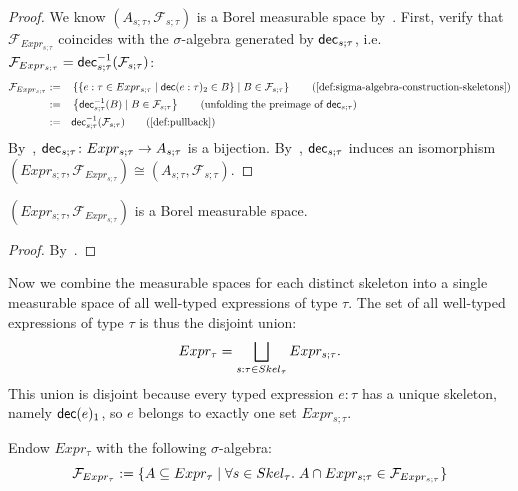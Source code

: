 \begin{proof}
	We know $(A_{s;\tau}, \mathcal{F}_{s;\tau})$ is a Borel measurable space by~. First, verify that $\mathcal{F}_{Expr_{s;\tau}}$ coincides with the $\sigma$-algebra generated by $\mathsf{dec}_{s;\tau}$, i.e. $\mathcal{F}_{Expr_{s;\tau}} = \mathsf{dec}_{s;\tau}^{-1}(\mathcal{F}_{s;\tau})$:
	\begin{align*}
		\mathcal{F}_{Expr_{s;\tau}} := \quad&\left\{
			\{e : \tau \in Expr_{s;\tau} \mid \decompose(e : \tau)_2 \in B\} \mid B \in 
			\mathcal{F}_{s;\tau}
		\right\} \tag{\Cref{def:sigma-algebra-construction-skeletons}} \\
		:= \quad&\left\{
			\decompose_{s;\tau}^{-1}(B) \mid B \in \mathcal{F}_{s;\tau}
		\right\} \tag{unfolding the preimage of $\decompose_{s;\tau}$} \\
		:= \quad&\decompose_{s;\tau}^{-1}(\mathcal{F}_{s;\tau}) \tag{\Cref{def:pullback}}
	\end{align*}
	By~, $\mathsf{dec}_{s;\tau} \colon Expr_{s;\tau} \to A_{s;\tau}$ is a bijection. By~, $\mathsf{dec}_{s;\tau}$ induces an isomorphism $(Expr_{s;\tau}, \mathcal{F}_{Expr_{s;\tau}}) \cong (A_{s;\tau}, \mathcal{F}_{s;\tau})$.
\end{proof}

\begin{lemma}\label{lem:measurable-expr-st}
	$(Expr_{s;\tau}, \mathcal{F}_{Expr_{s;\tau}})$ is a Borel measurable space.
\end{lemma}

\begin{proof}
	By~.
\end{proof}


Now we combine the measurable spaces for each distinct skeleton into a single measurable space of all well-typed expressions of type $\tau$. The set of all well-typed expressions of type $\tau$ is thus the disjoint union:
\[
	Expr_{\tau} = \bigsqcup_{s : \tau \in Skel_{\tau}} Expr_{s;\tau}.
\]
This union is disjoint because every typed expression $e : \tau$ has a unique skeleton, namely $\mathsf{dec}(e)_1$, so $e$ belongs to exactly one set $Expr_{s;\tau}$.

\begin{definition}\label{def:sigma-algebra-construction-expressions}
	Endow $Expr_\tau$ with the following $\sigma$-algebra: 
	\[
		\mathcal{F}_{Expr_{\tau}}
		:= \{A \subseteq Expr_{\tau} \mid \forall s \in Skel_{\tau} .\; A \cap Expr_{s;\tau} \in \mathcal{F}_{Expr_{s;\tau}}\}
	\]
\end{definition}

